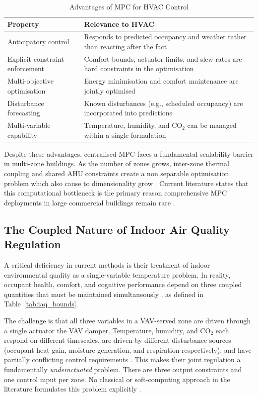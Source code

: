 \documentclass[12pt, a4paper]{article}
\begin{document}
	\begin{table}[h]
		\centering
		\caption{Advantages of MPC for HVAC Control}
		\label{tab:mpc_advantages}
		\begin{tabular}{lp{8cm}}
			\toprule
			\textbf{Property} & \textbf{Relevance to HVAC} \\
			\midrule
			Anticipatory control & Responds to predicted occupancy and weather rather than reacting after the fact \\
			Explicit constraint enforcement & Comfort bounds, actuator limits, and slew rates are hard constraints in the optimisation \\
			Multi-objective optimisation & Energy minimisation and comfort maintenance are jointly optimised \\
			Disturbance forecasting & Known disturbances (e.g., scheduled occupancy) are incorporated into predictions \\
			Multi-variable capability & Temperature, humidity, and CO$_2$ can be managed within a single formulation \\
			\bottomrule
		\end{tabular}
	\end{table}
	
	Despite these advantages, centralised MPC faces a fundamental scalability barrier in multi-zone buildings. As the number of zones grows, inter-zone thermal coupling and shared AHU constraints create a non separable optimisation problem which also cause to dimensionality grow \citep{yangHVACEnergyCost2019}. Current literature states that this computational bottleneck is the primary reason comprehensive MPC deployments in large commercial buildings remain rare \citep{aframTheoryApplicationsHVAC2014, balaliEnergyModellingControl2023}.
	
	\subsection{The Coupled Nature of Indoor Air Quality Regulation}
	\label{sec:iaq}
	
	A critical deficiency in current methods is their treatment of indoor environmental quality as a single-variable temperature problem. In reality, occupant health, comfort, and cognitive performance depend on three coupled quantities that must be maintained simultaneously \citep{aframTheoryApplicationsHVAC2014}, as defined in Table~\ref{tab:iaq_bounds}.
	
	The challenge is that all three variables in a VAV-served zone are driven through a single actuator the VAV damper. Temperature, humidity, and CO$_2$ each respond on different timescales, are driven by different disturbance sources (occupant heat gain, moisture generation, and respiration respectively), and have partially conflicting control requirements \citep{wangSupervisoryOptimalControl2008}. This makes their joint regulation a fundamentally \textit{underactuated} problem. There are three output constraints and one control input per zone. No classical or soft-computing approach in the literature formulates this problem explicitly \citep{naiduAdvancedControlStrategies2011, dounisAdvancedControlSystems2009}.
	
\end{document}
